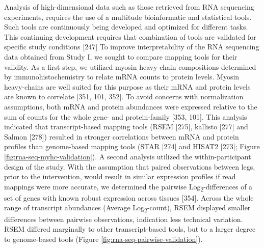 \documentclass[twoside,10pt]{gihclass} %
\begin{document}
Analysis of high-dimensional data such as those retrieved from RNA sequencing experiments, requires the use of a multitude bioinformatic and statistical tools. Such tools are continuously being developed and optimized for different tasks. This continuing development requires that combination of tools are validated for specific study conditions {[}247{]}
To improve interpretability of the RNA sequencing data obtained from Study I, we sought to compare mapping tools for their validity. As a first step, we utilized myosin heavy-chain compositions determined by immunohistochemistry to relate mRNA counts to protein levels. Myosin heavy-chains are well suited for this purpose as their mRNA and protein levels are known to correlate
{[}351, 101, 352{]}.
To avoid concerns with normalization assumptions, both mRNA and protein abundances were expressed relative to the sum of counts for the whole gene- and protein-family
{[}353, 101{]}.
This analysis indicated that transcript-based mapping tools
(RSEM {[}275{]},
kallisto {[}277{]} and Salmon {[}278{]})
resulted in stronger correlations between mRNA and protein profiles than genome-based mapping tools
(STAR {[}274{]}
and HISAT2 {[}273{]}; Figure \ref{fig:rna-seq-myhc-validation}).
A second analysis utilized the within-participant design of the study. With the assumption that paired observations between legs, prior to the intervention, would result in similar expression profiles if read mappings were more accurate, we determined the pairwise Log\textsubscript{2}-differences of a set of genes with known robust expression across tissues {[}354{]}.
Across the whole range of transcript abundances (Average Log\textsubscript{2}-count), RSEM displayed smaller differences between pairwise observations, indication less technical variation. RSEM differed marginally to other transcript-based tools, but to a larger degree to genome-based tools (Figure \ref{fig:rna-seq-pairwise-validation}).
\end{document}
